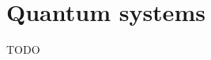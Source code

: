 \documentclass[aps,pra,10pt,twocolumn,floatfix,nofootinbib]{revtex4-1}
\numberwithin{equation}{section}
\theoremstyle{definition}
\begin{document}
\section{Quantum systems}

TODO





\end{document}

